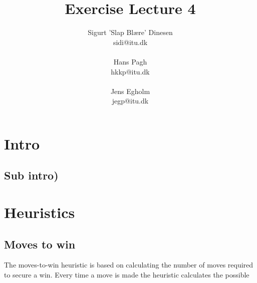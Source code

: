 \documentclass[a4paper, titlepage]{article}
\begin{document}
\title{Exercise Lecture 4}
\author{Sigurt 'Slap Blære' Dinesen \\sidi{@}itu.dk \\\\ Hans Pagh \\hkkp@itu.dk \\\\Jens
Egholm \\jegp@itu.dk}
\maketitle
\tableofcontents
\pagebreak

\section*{Intro}
\subsection*{Sub intro)}

\section*{Heuristics}

\subsection*{Moves to win}
The moves-to-win heuristic is based on calculating the number of moves required to 
secure a win. Every time a move is made the heuristic calculates the possible 
\end{document}
